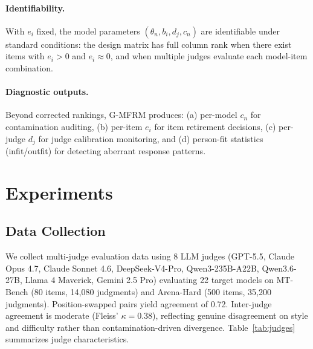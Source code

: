 \documentclass[11pt]{article}
\begin{document}
\paragraph{Identifiability.}
With $e_i$ fixed, the model parameters $(\theta_n, b_i, d_j, c_n)$ are identifiable under standard conditions: the design matrix has full column rank when there exist items with $e_i > 0$ and $e_i \approx 0$, and when multiple judges evaluate each model-item combination.

\paragraph{Diagnostic outputs.}
Beyond corrected rankings, G-MFRM produces: (a) per-model $c_n$ for contamination auditing, (b) per-item $e_i$ for item retirement decisions, (c) per-judge $d_j$ for judge calibration monitoring, and (d) person-fit statistics (infit/outfit) for detecting aberrant response patterns.

\section{Experiments}

\subsection{Data Collection}
\label{sec:data}

We collect multi-judge evaluation data using 8 LLM judges (GPT-5.5, Claude Opus 4.7, Claude Sonnet 4.6, DeepSeek-V4-Pro, Qwen3-235B-A22B, Qwen3.6-27B, Llama 4 Maverick, Gemini 2.5 Pro) evaluating 22 target models on MT-Bench (80 items, 14{,}080 judgments) and Arena-Hard (500 items, 35{,}200 judgments).
Position-swapped pairs yield agreement of 0.72.
Inter-judge agreement is moderate (Fleiss' $\kappa = 0.38$), reflecting genuine disagreement on style and difficulty rather than contamination-driven divergence.
Table~\ref{tab:judges} summarizes judge characteristics.
\end{document}
